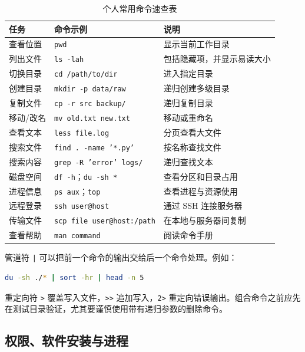 \documentclass[UTF8,zihao=-4,a4paper,fontset=windows]{ctexart}
\begin{document}
\begin{table}[H]
\centering
\caption{个人常用命令速查表}
\small
\begin{tabularx}{\textwidth}{C{3.0cm}Y Y}
\toprule
\textbf{任务} & \textbf{命令示例} & \textbf{说明} \\
\midrule
查看位置 & \texttt{pwd} & 显示当前工作目录 \\
列出文件 & \texttt{ls -lah} & 包括隐藏项，并显示易读大小 \\
切换目录 & \texttt{cd /path/to/dir} & 进入指定目录 \\
创建目录 & \texttt{mkdir -p data/raw} & 递归创建多级目录 \\
复制文件 & \texttt{cp -r src backup/} & 递归复制目录 \\
移动/改名 & \texttt{mv old.txt new.txt} & 移动或重命名 \\
查看文本 & \texttt{less file.log} & 分页查看大文件 \\
搜索文件 & \texttt{find . -name '*.py'} & 按名称查找文件 \\
搜索内容 & \texttt{grep -R 'error' logs/} & 递归查找文本 \\
磁盘空间 & \texttt{df -h}；\texttt{du -sh *} & 查看分区和目录占用 \\
进程信息 & \texttt{ps aux}；\texttt{top} & 查看进程与资源使用 \\
远程登录 & \texttt{ssh user@host} & 通过 SSH 连接服务器 \\
传输文件 & \texttt{scp file user@host:/path} & 在本地与服务器间复制 \\
查看帮助 & \texttt{man command} & 阅读命令手册 \\
\bottomrule
\end{tabularx}
\end{table} \FloatBarrier

 管道符 \texttt{|} 可以把前一个命令的输出交给后一个命令处理。例如：

\begin{lstlisting}[language=bash,caption={查找最占空间的五个子目录}]
du -sh ./* | sort -hr | head -n 5
\end{lstlisting}

重定向符 \texttt{>} 覆盖写入文件，\texttt{>>} 追加写入，\texttt{2>} 重定向错误输出。组合命令之前应先在测试目录验证，尤其要谨慎使用带有递归参数的删除命令。

\subsection{权限、软件安装与进程}
\end{document}
